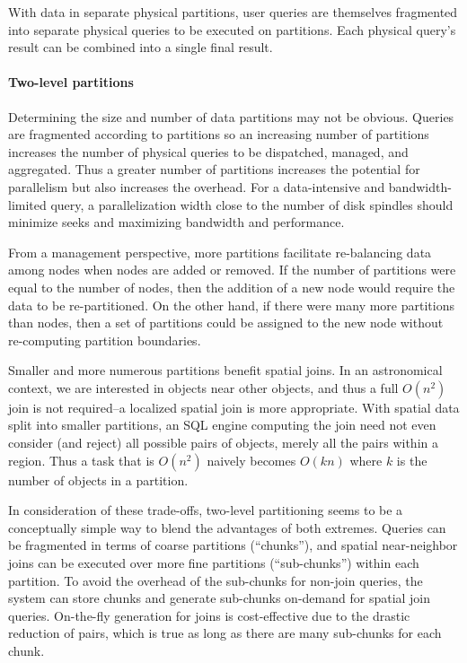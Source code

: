 \documentclass[DM,lsstdraft,toc]{lsstdoc}
\begin{document}
With data in separate physical partitions, user queries are themselves
fragmented into separate physical queries to be executed on partitions.
Each physical query's result can be combined into a single final result.

\paragraph{Two-level partitions}\label{two-level-partitions}

Determining the size and number of data partitions may not be obvious.
Queries are fragmented according to partitions so an increasing number
of partitions increases the number of physical queries to be dispatched,
managed, and aggregated. Thus a greater number of partitions increases
the potential for parallelism but also increases the overhead. For a
data-intensive and bandwidth-limited query, a parallelization width
close to the number of disk spindles should minimize seeks and
maximizing bandwidth and performance.

From a management perspective, more partitions facilitate re-balancing
data among nodes when nodes are added or removed. If the number of
partitions were equal to the number of nodes, then the addition of a new
node would require the data to be re-partitioned. On the other hand, if
there were many more partitions than nodes, then a set of partitions
could be assigned to the new node without re-computing partition
boundaries.

Smaller and more numerous partitions benefit spatial joins. In an
astronomical context, we are interested in objects near other objects,
and thus a full \(O(n^2)\) join is not required--a localized spatial
join is more appropriate. With spatial data split into smaller
partitions, an SQL engine computing the join need not even consider (and
reject) all possible pairs of objects, merely all the pairs within a
region. Thus a task that is \(O(n^2)\) naively becomes \(O(kn)\) where
\(k\) is the number of objects in a partition.

In consideration of these trade-offs, two-level partitioning seems to be
a conceptually simple way to blend the advantages of both extremes.
Queries can be fragmented in terms of coarse partitions (``chunks''),
and spatial near-neighbor joins can be executed over more fine
partitions (``sub-chunks'') within each partition. To avoid the overhead
of the sub-chunks for non-join queries, the system can store chunks and
generate sub-chunks on-demand for spatial join queries. On-the-fly
generation for joins is cost-effective due to the drastic reduction of
pairs, which is true as long as there are many sub-chunks for each
chunk.
\end{document}
